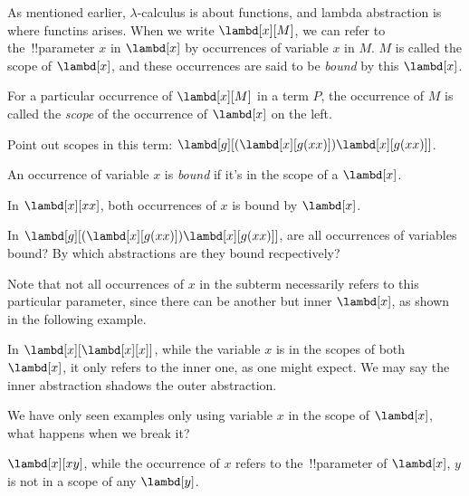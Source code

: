 \documentclass[../../../include/open-logic-section]{subfiles}
\begin{document}

As mentioned earlier, $\lambda$-calculus is about functions, and
lambda abstraction is where functins arises. When we
write $\lambd[x][M]$, we can refer to the~!!{parameter} $x$ in $\lambd[x]$ by
occurrences of variable $x$ in $M$. $M$ is called the
scope of $\lambd[x]$, and these occurrences are said to be \emph{bound} by this
$\lambd[x]$. 

\begin{defn}[Scope]
For a particular occurrence of $\lambd[x][M]$ in a term $P$, the
occurrence of $M$ is called the \emph{scope} of the occurrence of $\lambd[x]$
on the left.
\end{defn}

\begin{prob}
  Point out scopes in this term: $\lambd[g][(\lambd[x][g (x x)]) \lambd[x][g (x x)]]$.
\end{prob}

\begin{defn}
  An occurrence of variable $x$ is \emph{bound} if it's in the scope of a $\lambd[x]$.
\end{defn}

\begin{ex}
  In $\lambd[x][x x]$, both occurrences of $x$ is bound by $\lambd[x]$.
\end{ex}

\begin{prob}
  In $\lambd[g][(\lambd[x][g (x x)]) \lambd[x][g (x x)]]$, are all
  occurrences of variables bound? By which abstractions are they
  bound recpectively?
\end{prob}

Note that not all occurrences of $x$ in the subterm necessarily refers to this particular parameter,
since there can be another but inner $\lambd[x]$, as shown in the
following example. 
\begin{ex}
In $\lambd[x][\lambd[x][x]]$, while the variable $x$ is in the
scopes of both $\lambd[x]$, it only refers to the inner one, as one
might expect. We may say the inner abstraction shadows the outer
abstraction.
\end{ex}

We have only seen examples only using variable $x$ in the scope of $\lambd[x]$, 
what happens when we break it?
\begin{ex}
  $\lambd[x][x y]$, while the occurrence of $x$ refers to the~!!{parameter} of $\lambd[x]$, $y$ is not in a scope
  of any $\lambd[y]$. 
\end{ex}
\end{document}

